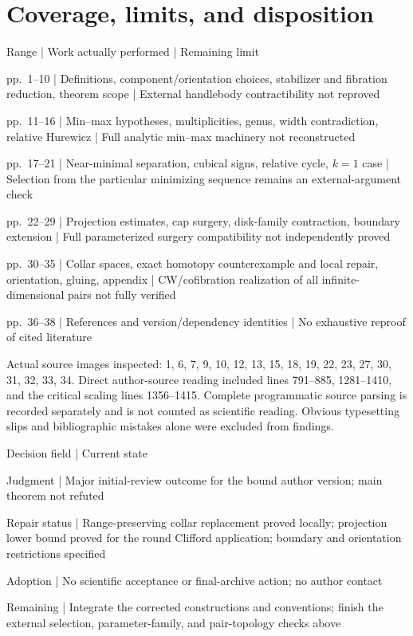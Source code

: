 \documentclass[10pt]{article}
\begin{document}
\section*{Coverage, limits, and disposition}
Range | Work actually performed | Remaining limit\par
pp. 1–10 | Definitions, component/orientation choices, stabilizer and fibration reduction, theorem scope | External handlebody contractibility not reproved\par
pp. 11–16 | Min–max hypotheses, multiplicities, genus, width contradiction, relative Hurewicz | Full analytic min–max machinery not reconstructed\par
pp. 17–21 | Near-minimal separation, cubical signs, relative cycle, \(k=1\) case | Selection from the particular minimizing sequence remains an external-argument check\par
pp. 22–29 | Projection estimates, cap surgery, disk-family contraction, boundary extension | Full parameterized surgery compatibility not independently proved\par
pp. 30–35 | Collar spaces, exact homotopy counterexample and local repair, orientation, gluing, appendix | CW/cofibration realization of all infinite-dimensional pairs not fully verified\par
pp. 36–38 | References and version/dependency identities | No exhaustive reproof of cited literature\par
Actual source images inspected: 1, 6, 7, 9, 10, 12, 13, 15, 18, 19, 22, 23, 27, 30, 31, 32, 33, 34. Direct author-source reading included lines 791–885, 1281–1410, and the critical scaling lines 1356–1415. Complete programmatic source parsing is recorded separately and is not counted as scientific reading. Obvious typesetting slips and bibliographic mistakes alone were excluded from findings.\par
Decision field | Current state\par
Judgment | Major initial-review outcome for the bound author version; main theorem not refuted\par
Repair status | Range-preserving collar replacement proved locally; projection lower bound proved for the round Clifford application; boundary and orientation restrictions specified\par
Adoption | No scientific acceptance or final-archive action; no author contact\par
Remaining | Integrate the corrected constructions and conventions; finish the external selection, parameter-family, and pair-topology checks above\par
\end{document}
